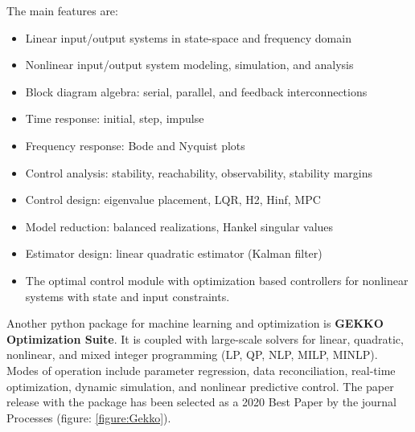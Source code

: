 The main features are: 

\begin{itemize}
	\item Linear input/output systems in state-space and frequency domain
	
	\item Nonlinear input/output system modeling, simulation, and analysis
	
	\item Block diagram algebra: serial, parallel, and feedback interconnections
	
	\item Time response: initial, step, impulse
	
	\item Frequency response: Bode and Nyquist plots
	
	\item Control analysis: stability, reachability, observability, stability margins
	
	\item Control design: eigenvalue placement, LQR, H2, Hinf, MPC
	
	\item Model reduction: balanced realizations, Hankel singular values
	
	\item Estimator design: linear quadratic estimator (Kalman filter)
	
	\item The optimal control module with optimization based controllers for nonlinear systems with state and input constraints.
	
\end{itemize}

Another python package for machine learning and optimization is \textbf{GEKKO Optimization Suite}\cite{gekko2018}. It is coupled with large-scale solvers for linear, quadratic, nonlinear, and mixed integer programming (LP, QP, NLP, MILP, MINLP). Modes of operation include parameter regression, data reconciliation, real-time optimization, dynamic simulation, and nonlinear predictive control. The paper release with the package has been selected as a 2020 Best Paper by the journal Processes (figure: \ref{figure:Gekko}). 

